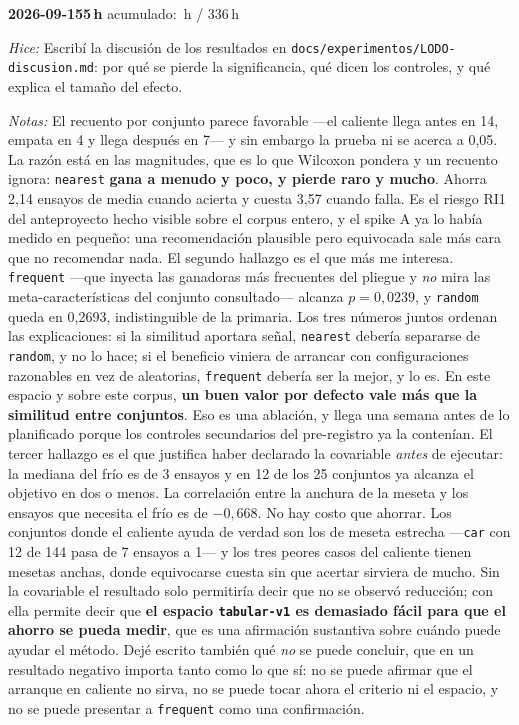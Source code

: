 \documentclass[11pt,letterpaper]{article}
\newcommand{\presupuesto}{336}
\newcommand{\horasacum}{0}
\newcommand{\entrada}[4]{%
  \xdef\horasacum{\fpeval{\horasacum + #2}}%
  \par\medskip
  \noindent\textbf{\color{tecnavy}#1}\quad\textbf{#2\,h}%
  \hfill{\small\color{gris}acumulado: \horasacum\,h / \presupuesto\,h}\par
  \nopagebreak
  \noindent\textit{Hice:} #3\par
  \nopagebreak
  \noindent\textit{Notas:} #4\par
}
\begin{document}
\entrada{2026-09-15}{5}
{Escribí la discusión de los resultados en \texttt{docs/experimentos/LODO-discusion.md}: por
 qué se pierde la significancia, qué dicen los controles, y qué explica el tamaño del efecto.}
{El recuento por conjunto parece favorable —el caliente llega antes en 14, empata en 4 y
 llega después en 7— y sin embargo la prueba ni se acerca a 0,05. La razón está en las
 magnitudes, que es lo que Wilcoxon pondera y un recuento ignora: \texttt{nearest}
 \textbf{gana a menudo y poco, y pierde raro y mucho}. Ahorra 2,14 ensayos de media cuando
 acierta y cuesta 3,57 cuando falla. Es el riesgo RI1 del anteproyecto hecho visible sobre
 el corpus entero, y el spike A ya lo había medido en pequeño: una recomendación plausible
 pero equivocada sale más cara que no recomendar nada. El segundo hallazgo es el que más me
 interesa. \texttt{frequent} —que inyecta las ganadoras más frecuentes del pliegue y
 \emph{no} mira las meta-características del conjunto consultado— alcanza $p = 0{,}0239$, y
 \texttt{random} queda en 0,2693, indistinguible de la primaria. Los tres números juntos
 ordenan las explicaciones: si la similitud aportara señal, \texttt{nearest} debería
 separarse de \texttt{random}, y no lo hace; si el beneficio viniera de arrancar con
 configuraciones razonables en vez de aleatorias, \texttt{frequent} debería ser la mejor, y
 lo es. En este espacio y sobre este corpus, \textbf{un buen valor por defecto vale más que
 la similitud entre conjuntos}. Eso es una ablación, y llega una semana antes de lo
 planificado porque los controles secundarios del pre-registro ya la contenían. El tercer
 hallazgo es el que justifica haber declarado la covariable \emph{antes} de ejecutar: la
 mediana del frío es de 3 ensayos y en 12 de los 25 conjuntos ya alcanza el objetivo en dos
 o menos. La correlación entre la anchura de la meseta y los ensayos que necesita el frío es
 de $-0{,}668$. No hay costo que ahorrar. Los conjuntos donde el caliente ayuda de verdad
 son los de meseta estrecha —\texttt{car} con 12 de 144 pasa de 7 ensayos a 1— y los tres
 peores casos del caliente tienen mesetas anchas, donde equivocarse cuesta sin que acertar
 sirviera de mucho. Sin la covariable el resultado solo permitiría decir que no se observó
 reducción; con ella permite decir que \textbf{el espacio \texttt{tabular-v1} es demasiado
 fácil para que el ahorro se pueda medir}, que es una afirmación sustantiva sobre cuándo
 puede ayudar el método. Dejé escrito también qué \emph{no} se puede concluir, que en un
 resultado negativo importa tanto como lo que sí: no se puede afirmar que el arranque en
 caliente no sirva, no se puede tocar ahora el criterio ni el espacio, y no se puede
 presentar a \texttt{frequent} como una confirmación.}
\end{document}
